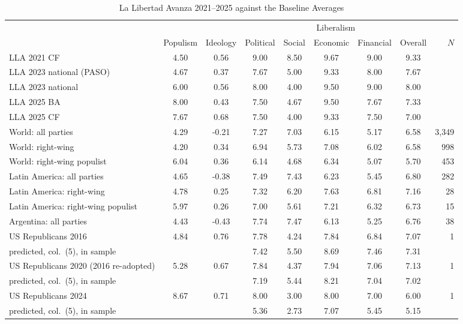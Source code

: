 \begin{table}[htbp]\centering\scriptsize\setlength{\tabcolsep}{4pt}
\caption{La Libertad Avanza 2021--2025 against the Baseline Averages}\label{tab:argentina_lla}
\begin{tabular}{@{}lcccccccr@{}}\toprule
 & & & \multicolumn{5}{c}{Liberalism} & \\ \cmidrule(lr){4-8}
 & Populism & Ideology & Political & Social & Economic & Financial & Overall & $N$ \\ \midrule
LLA 2021 CF & 4.50 & 0.56 & 9.00 & 8.50 & 9.67 & 9.00 & 9.33 & \\
LLA 2023 national (PASO) & 4.67 & 0.37 & 7.67 & 5.00 & 9.33 & 8.00 & 7.67 & \\
LLA 2023 national & 6.00 & 0.56 & 8.00 & 4.00 & 9.50 & 9.00 & 8.00 & \\
LLA 2025 BA & 8.00 & 0.43 & 7.50 & 4.67 & 9.50 & 7.67 & 7.33 & \\
LLA 2025 CF & 7.67 & 0.68 & 7.50 & 4.00 & 9.33 & 7.50 & 7.00 & \\
\midrule
World: all parties & 4.29 & -0.21 & 7.27 & 7.03 & 6.15 & 5.17 & 6.58 & 3,349 \\
World: right-wing & 4.20 & 0.34 & 6.94 & 5.73 & 7.08 & 6.02 & 6.58 & 998 \\
World: right-wing populist & 6.04 & 0.36 & 6.14 & 4.68 & 6.34 & 5.07 & 5.70 & 453 \\
Latin America: all parties & 4.65 & -0.38 & 7.49 & 7.43 & 6.23 & 5.45 & 6.80 & 282 \\
Latin America: right-wing & 4.78 & 0.25 & 7.32 & 6.20 & 7.63 & 6.81 & 7.16 & 28 \\
Latin America: right-wing populist & 5.97 & 0.26 & 7.00 & 5.61 & 7.21 & 6.32 & 6.73 & 15 \\
Argentina: all parties & 4.43 & -0.43 & 7.74 & 7.47 & 6.13 & 5.25 & 6.76 & 38 \\
\midrule
US Republicans 2016 & 4.84 & 0.76 & 7.78 & 4.24 & 7.84 & 6.84 & 7.07 & 1 \\
\quad predicted, col.\ (5), in sample & & & 7.42 & 5.50 & 8.69 & 7.46 & 7.31 & \\
US Republicans 2020 (2016 re-adopted) & 5.28 & 0.67 & 7.84 & 4.37 & 7.94 & 7.06 & 7.13 & 1 \\
\quad predicted, col.\ (5), in sample & & & 7.19 & 5.44 & 8.21 & 7.04 & 7.02 & \\
US Republicans 2024 & 8.67 & 0.71 & 8.00 & 3.00 & 8.00 & 7.00 & 6.00 & 1 \\
\quad predicted, col.\ (5), in sample & & & 5.36 & 2.73 & 7.07 & 5.45 & 5.15 & \\

\end{tabular}
\end{table}
